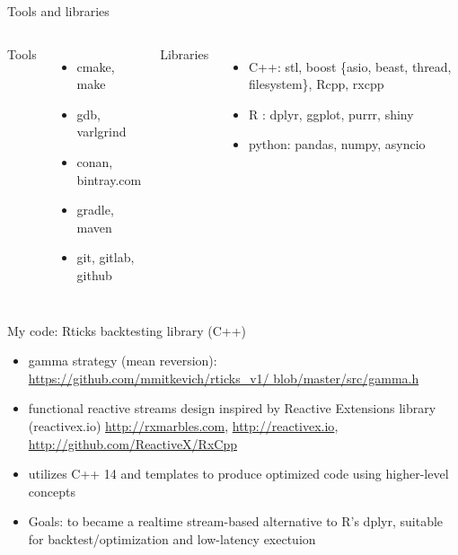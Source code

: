 \documentclass[10pt]{beamer}
\begin{document}
\begin{frame}{Tools and libraries}
\begin{columns}[T,onlytextwidth]
	Tools 
	\begin{itemize}
		\item cmake, make
		\item gdb, varlgrind
		\item conan, bintray.com
		\item gradle, maven
		\item git, gitlab, github
	\end{itemize}	
	Libraries
	\begin{itemize}
		\item C++: stl, boost \{asio, beast, thread, filesystem\}, Rcpp, rxcpp
		\item R : dplyr, ggplot, purrr, shiny
		\item python: pandas, numpy, asyncio
	\end{itemize}
\end{columns}
\end{frame}

\begin{frame}{My code: Rticks backtesting library (C++)}
\begin{itemize}
	\item gamma strategy (mean reversion): \href{https://github.com/mmitkevich/rticks_v1/blob/master/src/gamma.h} {https://github.com/mmitkevich/rticks\_v1/
		blob/master/src/gamma.h}
	\item functional reactive streams design inspired by  Reactive Extensions library (reactivex.io) \href{http://rxmarbles.com}{http://rxmarbles.com}, \href{http://reactivex.io}{http://reactivex.io}, \href{https://github.com/ReactiveX/RxCpp/tree/master/Rx/v2/src/rxcpp}{http://github.com/ReactiveX/RxCpp}
	\item utilizes C++ 14 and templates to produce optimized code using higher-level concepts
	\item Goals: to became a realtime stream-based alternative to R's dplyr, suitable for backtest/optimization and low-latency exectuion
\end{itemize}
\end{frame}
\end{document}
